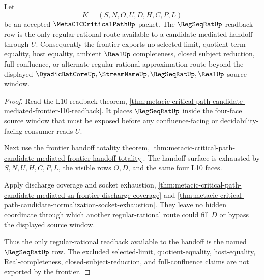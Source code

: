 \begin{theorem}
\label{thm:metacic-critical-path-candidate-frontier-regseqrat-handoff}
Let
$$
K=(S,N,O,U,D,H,C,P,L)
$$
be an accepted $\MetaCICCriticalPathUp$ packet. The $\RegSeqRatUp$ readback row is the only regular-rational route available to a candidate-mediated handoff through $U$. Consequently the frontier exports no selected limit, quotient term equality, host equality, ambient $\RealUp$ completeness, closed subject reduction, full confluence, or alternate regular-rational approximation route beyond the displayed $\DyadicRatCoreUp,\StreamNameUp,\RegSeqRatUp,\RealUp$ source window.
\end{theorem}
\begin{proof}
Read the L10 readback theorem, \autoref{thm:metacic-critical-path-candidate-mediated-frontier-l10-readback}. It places $\RegSeqRatUp$ inside the four-face source window that must be exposed before any confluence-facing or decidability-facing consumer reads $U$.

Next use the frontier handoff totality theorem, \autoref{thm:metacic-critical-path-candidate-mediated-frontier-handoff-totality}. The handoff surface is exhausted by $S,N,U,H,C,P,L$, the visible rows $O,D$, and the same four L10 faces.

Apply discharge coverage and socket exhaustion, \autoref{thm:metacic-critical-path-candidate-mediated-sn-frontier-discharge-coverage} and \autoref{thm:metacic-critical-path-candidate-normalization-socket-exhaustion}. They leave no hidden coordinate through which another regular-rational route could fill $D$ or bypass the displayed source window.

Thus the only regular-rational readback available to the handoff is the named $\RegSeqRatUp$ row. The excluded selected-limit, quotient-equality, host-equality, Real-completeness, closed-subject-reduction, and full-confluence claims are not exported by the frontier.
\end{proof}

